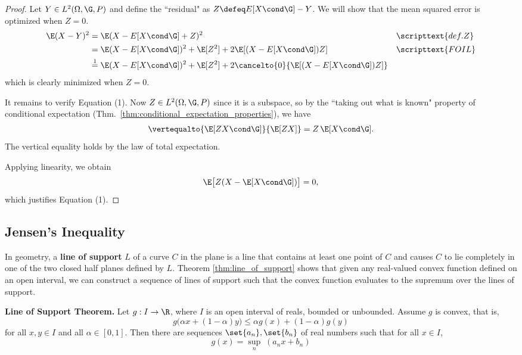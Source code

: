 \documentclass{article} %
\begin{document}
\begin{proof}
Let $Y \in L^2(\Omega, \G, P)$ and define the ``residual" as $Z \defeq E[X \cond \G]-Y$.  We will show that the mean squared error is optimized when $Z=0$.
%
\begin{align*}
\E(X-Y)^2 &= \E(X- E[X \cond \G] + Z)^2 && \scripttext{def. Z} \\
&= \E(X- E[X \cond \G])^2 + \E[Z^2] + 2\E[(X- E[X \cond \G])Z] && \scripttext{FOIL} \\
&\stackrel{1}{=} \E(X- E[X \cond \G])^2 + \E[Z^2] + 2 \cancelto{0}{\E[(X- E[X \cond \G])Z]}
\end{align*}
which is clearly minimized when $Z = 0$.

It remains to verify Equation (1).  Now $Z \in L^2(\Omega, \G, P)$ since it is a subspace, so by the ``taking out what is known" property of conditional expectation (Thm.~\ref{thm:conditional_expectation_properties}), we have
\begin{align*}
\vertequalto{\E[ZX \cond \G]}{\E[ZX]} = Z \, \E[X \cond \G].
\end{align*} 
%
The vertical equality holds by the law of total expectation.

Applying linearity, we obtain
\[ \E\big[Z(X - \E[X \cond \G])\big] = 0, \]
which justifies Equation (1).
\end{proof}

\subsection{Jensen's Inequality \footnotemark}


In geometry, a \textbf{line of support} $L$ of a curve $C$ in the plane is a line that contains at least one point of $C$ and causes $C$ to lie completely in one of the two closed half planes defined by $L$.  Theorem \ref{thm:line_of_support} shows that given any real-valued convex function defined on an open interval, we can construct a sequence of lines of support such that the convex function evaluates to the supremum over the lines of support.  

\begin{theorem}
\textbf{Line of Support Theorem.}  Let $g : I \to \R$, where $I$ is an open interval of reals, bounded or unbounded. Assume $g$ is convex, that is,
\[g \big(\alpha x + (1-\alpha) y \big) \leq \alpha g(x) + (1-\alpha) g(y) \]
for all $x,y \in I$ and all $\alpha \in [0,1]$.  Then there are sequences $\set{a_n}, \set{b_n}$ of real numbers such that for all $x \in I$, 
\[ g(x) = \sup_n \; (a_n x + b_n)\]
\label{thm:line_of_support}
\end{theorem}
\end{document}
